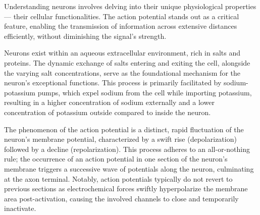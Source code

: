 \documentclass[12pt,a4paper]{report}
\begin{document}
Understanding neurons involves delving into their unique physiological properties — their cellular functionalities. The action potential stands out as a critical feature, enabling the transmission of information across extensive distances efficiently, without diminishing the signal's strength.

Neurons exist within an aqueous extracellular environment, rich in salts and proteins. The dynamic exchange of salts entering and exiting the cell, alongside the varying salt concentrations, serve as the foundational mechanism for the neuron's exceptional functions. This process is primarily facilitated by sodium-potassium pumps, which expel sodium from the cell while importing potassium, resulting in a higher concentration of sodium externally and a lower concentration of potassium outside compared to inside the neuron.

The phenomenon of the action potential is a distinct, rapid fluctuation of the neuron's membrane potential, characterized by a swift rise (depolarization) followed by a decline (repolarization). This process adheres to an all-or-nothing rule; the occurrence of an action potential in one section of the neuron's membrane triggers a successive wave of potentials along the neuron, culminating at the axon terminal. Notably, action potentials typically do not revert to previous sections as electrochemical forces swiftly hyperpolarize the membrane area post-activation, causing the involved channels to close and temporarily inactivate.
\end{document}
